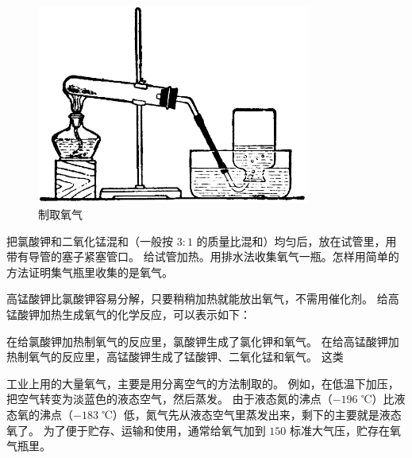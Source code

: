 \begin{figure}[htbp]
    \centering
    \includegraphics[width=9cm]{../pic/czhx1-ch1-9}
    \caption{制取氧气}\label{fig:1-9}
\end{figure}

\begin{shiyan}
把氯酸钾和二氧化锰混和（一般按 $3:1$ 的质量比混和）均匀后，放在试管里，用带有导管的塞子紧塞管口。
给试管加热。用排水法收集氧气一瓶。怎样用简单的方法证明集气瓶里收集的是氧气。
\end{shiyan}

高锰酸钾比氯酸钾容易分解，只要稍稍加热就能放出氧气，不需用催化剂。
给高锰酸钾加热生成氧气的化学反应，可以表示如下：
\begin{fangchengshi}
\end{fangchengshi}

在给氯酸钾加热制氧气的反应里，氯酸钾生成了氯化钾和氧气。
在给高锰酸钾加热制氧气的反应里，高锰酸钾生成了锰酸钾、二氧化锰和氧气。
这类

工业上用的大量氧气，主要是用分离空气的方法制取的。
例如，在低温下加压，把空气转变为淡蓝色的液态空气，然后蒸发。
由于液态氮的沸点（$-196$ ℃）比液态氧的沸点（$-183$ ℃）低，氮气先从液态空气里蒸发出来，剩下的主要就是液态氧了。
为了便于贮存、运输和使用，通常给氧气加到 $150$ 标准大气压，贮存在氧气瓶里。

